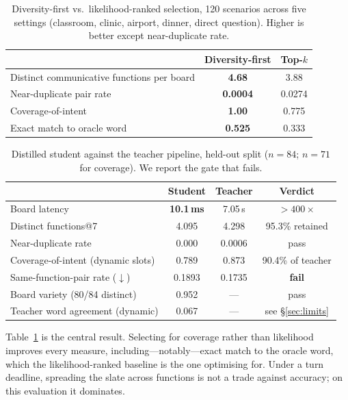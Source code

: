 \documentclass{article}
\begin{document}
\begin{table}[t]
\centering
\small
\caption{Diversity-first vs.\ likelihood-ranked selection, 120 scenarios across
five settings (classroom, clinic, airport, dinner, direct question). Higher is
better except near-duplicate rate.}
\label{tab:selection}
\begin{tabular}{lcc}
\toprule
 & \textbf{Diversity-first} & \textbf{Top-$k$} \\
\midrule
Distinct communicative functions per board & \textbf{4.68} & 3.88 \\
Near-duplicate pair rate                   & \textbf{0.0004} & 0.0274 \\
Coverage-of-intent                          & \textbf{1.00} & 0.775 \\
Exact match to oracle word                  & \textbf{0.525} & 0.333 \\
\bottomrule
\end{tabular}
\end{table}

\begin{table}[t]
\centering
\small
\caption{Distilled student against the teacher pipeline, held-out split
($n{=}84$; $n{=}71$ for coverage). We report the gate that fails.}
\label{tab:student}
\begin{tabular}{lccc}
\toprule
 & \textbf{Student} & \textbf{Teacher} & \textbf{Verdict} \\
\midrule
Board latency                       & \textbf{10.1\,ms} & 7.05\,s & ${>}400\times$ \\
Distinct functions@7                & 4.095 & 4.298 & 95.3\% retained \\
Near-duplicate rate                 & 0.000 & 0.0006 & pass \\
Coverage-of-intent (dynamic slots)  & 0.789 & 0.873 & 90.4\% of teacher \\
Same-function-pair rate ($\downarrow$) & 0.1893 & 0.1735 & \textbf{fail} \\
Board variety (80/84 distinct)      & 0.952 & --- & pass \\
Teacher word agreement (dynamic)    & 0.067 & --- & see \S\ref{sec:limits} \\
\bottomrule
\end{tabular}
\end{table}

Table~\ref{tab:selection} is the central result. Selecting for coverage rather
than likelihood improves every measure, including---notably---exact match to the
oracle word, which the likelihood-ranked baseline is the one optimising for.
Under a turn deadline, spreading the slate across functions is not a trade
against accuracy; on this evaluation it dominates.
\end{document}
